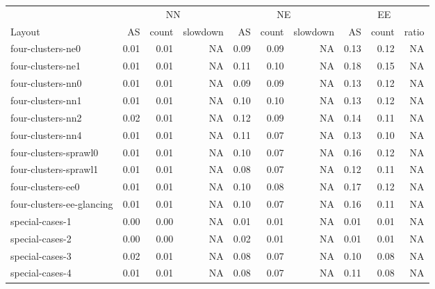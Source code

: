 \begin{tabular}{l|rrr|rrr|rrr}
\toprule
& \multicolumn{3}{c|}{NN} & \multicolumn{3}{c|}{NE} & \multicolumn{3}{c}{EE} \\
                         Layout &     AS &  count & slowdown &      AS &  count & slowdown &       AS &   count & ratio \\
\midrule
              four-clusters-ne0 &   0.01 &   0.01 &       NA &    0.09 &   0.09 &       NA &     0.13 &    0.12 &    NA \\
              four-clusters-ne1 &   0.01 &   0.01 &       NA &    0.11 &   0.10 &       NA &     0.18 &    0.15 &    NA \\
              four-clusters-nn0 &   0.01 &   0.01 &       NA &    0.09 &   0.09 &       NA &     0.13 &    0.12 &    NA \\
              four-clusters-nn1 &   0.01 &   0.01 &       NA &    0.10 &   0.10 &       NA &     0.13 &    0.12 &    NA \\
              four-clusters-nn2 &   0.02 &   0.01 &       NA &    0.12 &   0.09 &       NA &     0.14 &    0.11 &    NA \\
              four-clusters-nn4 &   0.01 &   0.01 &       NA &    0.11 &   0.07 &       NA &     0.13 &    0.10 &    NA \\
          four-clusters-sprawl0 &   0.01 &   0.01 &       NA &    0.10 &   0.07 &       NA &     0.16 &    0.12 &    NA \\
          four-clusters-sprawl1 &   0.01 &   0.01 &       NA &    0.08 &   0.07 &       NA &     0.12 &    0.11 &    NA \\
              four-clusters-ee0 &   0.01 &   0.01 &       NA &    0.10 &   0.08 &       NA &     0.17 &    0.12 &    NA \\
      four-clusters-ee-glancing &   0.01 &   0.01 &       NA &    0.10 &   0.07 &       NA &     0.16 &    0.11 &    NA \\
                special-cases-1 &   0.00 &   0.00 &       NA &    0.01 &   0.01 &       NA &     0.01 &    0.01 &    NA \\
                special-cases-2 &   0.00 &   0.00 &       NA &    0.02 &   0.01 &       NA &     0.01 &    0.01 &    NA \\
                special-cases-3 &   0.02 &   0.01 &       NA &    0.08 &   0.07 &       NA &     0.10 &    0.08 &    NA \\
                special-cases-4 &   0.01 &   0.01 &       NA &    0.08 &   0.07 &       NA &     0.11 &    0.08 &    NA \\

\end{tabular}

